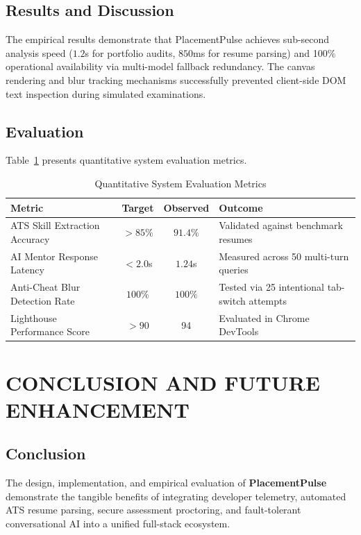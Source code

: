 \documentclass[12pt,a4paper]{report}
\begin{document}
\section{Results and Discussion}
The empirical results demonstrate that PlacementPulse achieves sub-second analysis speed ($1.2$s for portfolio audits, $850$ms for resume parsing) and 100\% operational availability via multi-model fallback redundancy. The canvas rendering and blur tracking mechanisms successfully prevented client-side DOM text inspection during simulated examinations.

\section{Evaluation}
Table~\ref{tab:eval_metrics} presents quantitative system evaluation metrics.

\begin{table}[htbp]
\centering
\footnotesize
\caption{Quantitative System Evaluation Metrics}
\label{tab:eval_metrics}
\begin{tabularx}{\textwidth}{l c c X}
\toprule
\textbf{Metric} & \textbf{Target} & \textbf{Observed} & \textbf{Outcome} \\
\midrule
ATS Skill Extraction Accuracy & $>85\%$ & $91.4\%$ & Validated against benchmark resumes \\
AI Mentor Response Latency & $<2.0$s & $1.24$s & Measured across 50 multi-turn queries \\
Anti-Cheat Blur Detection Rate & $100\%$ & $100\%$ & Tested via 25 intentional tab-switch attempts \\
Lighthouse Performance Score & $>90$ & 94 & Evaluated in Chrome DevTools \\
\bottomrule
\end{tabularx}
\end{table}


\chapter{CONCLUSION AND FUTURE ENHANCEMENT}

\section{Conclusion}
The design, implementation, and empirical evaluation of \textbf{PlacementPulse} demonstrate the tangible benefits of integrating developer telemetry, automated ATS resume parsing, secure assessment proctoring, and fault-tolerant conversational AI into a unified full-stack ecosystem.
\end{document}
